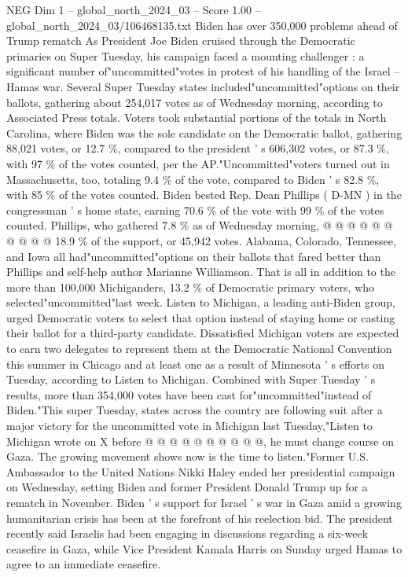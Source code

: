 \begin{textsample}{NEG Dim 1 – global\_north\_2024\_03 – Score 1.00 – global\_north\_2024\_03/106468135.txt}  \label{ex:f1_neg_392}
Biden has over 350,000 problems ahead of Trump rematch As President Joe Biden cruised through the Democratic primaries on Super Tuesday, his campaign faced a mounting challenger : a significant number of"uncommitted"votes in protest of his handling of the Israel -- Hamas war.
Several Super Tuesday states included"uncommitted"options on their ballots, gathering about 254,017 votes as of Wednesday morning, according to Associated Press totals.
Voters took substantial portions of the totals in North Carolina, where Biden was the sole candidate on the Democratic ballot, gathering 88,021 votes, or 12.7 \%, compared to the president ' s 606,302 votes, or 87.3 \%, with 97 \% of the votes counted, per the AP."Uncommitted"voters turned out in Massachusetts, too, totaling 9.4 \% of the vote, compared to Biden ' s 82.8 \%, with 85 \% of the votes counted.
Biden bested Rep.
Dean Phillips ( D-MN ) in the congressman ' s home state, earning 70.6 \% of the vote with 99 \% of the votes counted.
Phillips, who gathered 7.8 \% as of Wednesday morning, @ @ @ @ @ @ @ @ @ @ 18.9 \% of the support, or 45,942 votes.
Alabama, Colorado, Tennessee, and Iowa all had"uncommitted"options on their ballots that fared better than Phillips and self-help author Marianne Williamson.
That is all in addition to the more than 100,000 Michiganders, 13.2 \% of Democratic primary voters, who selected"uncommitted"last week.
Listen to Michigan, a leading anti-Biden group, urged Democratic voters to select that option instead of staying home or casting their ballot for a third-party candidate.
Dissatisfied Michigan voters are expected to earn two delegates to represent them at the Democratic National Convention this summer in Chicago and at least one as a result of Minnesota ' s efforts on Tuesday, according to Listen to Michigan.
Combined with Super Tuesday ' s results, more than 354,000 votes have been cast for"uncommitted"instead of Biden."This super Tuesday, states across the country are following suit after a major victory for the uncommitted vote in Michigan last Tuesday,"Listen to Michigan wrote on X before @ @ @ @ @ @ @ @ @ @, he must change course on Gaza.
The growing movement shows now is the time to listen."Former U.S.
Ambassador to the United Nations Nikki Haley ended her presidential campaign on Wednesday, setting Biden and former President Donald Trump up for a rematch in November.
Biden ' s support for Israel ' s war in Gaza amid a growing humanitarian crisis has been at the forefront of his reelection bid.
The president recently said Israelis had been engaging in discussions regarding a six-week ceasefire in Gaza, while Vice President Kamala Harris on Sunday urged Hamas to agree to an immediate ceasefire.

\end{textsample}
